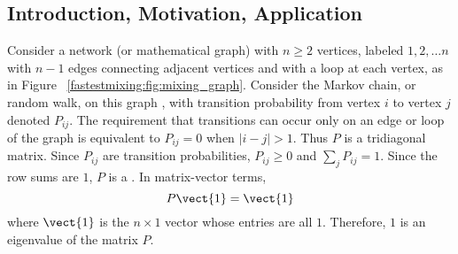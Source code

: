 \documentclass[12pt]{article}
\begin{document}
\subsection*{Introduction, Motivation, Application}

Consider a network (or mathematical graph) with \( n \ge 2 \) vertices,
labeled \( 1,2, \dots n \) with \( n-1 \) edges connecting adjacent
vertices and with a loop at each vertex, as in Figure~%
\ref{fastestmixing:fig:mixing_graph}.  Consider the Markov chain, or
random walk, on this graph%
%
, with transition probability from vertex \( i \) to vertex \( j \)
denoted \( P_{ij} \).  The requirement that transitions can occur only
on an edge or loop of the graph is equivalent to \( P_{ij} = 0 \) when \(
|i -j| > 1 \).  Thus \( P \) is a tridiagonal matrix.%
Since \( P_{ij} \) are transition probabilities, \( P_{ij} \ge 0 \) and \(
\sum_{j} P_{ij} = 1 \).  Since the row sums are \( 1 \), \( P \) is a
.%
In matrix-vector terms,
\begin{equation}
    P \vect{1} = \vect{1}%
    \label{fastestmixing:eq:eigenvalue_one}
\end{equation}
where \( \vect{1} \) is the \( n \times 1 \) vector whose entries are
all \( 1 \).  Therefore, \( 1 \) is an eigenvalue of the matrix \( P \).
\end{document}
